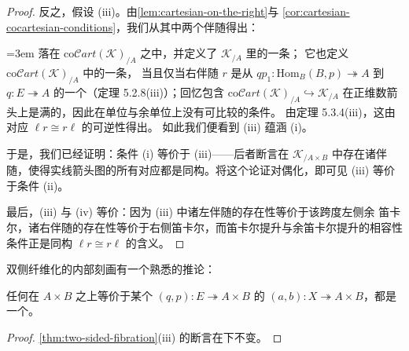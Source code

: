 \begin{proof}
反之，假设 (iii)。由\cref{lem:cartesian-on-the-right}与%
\cref{cor:cartesian-cocartesian-conditions}，我们从其中两个伴随得出：%
\trFunctor{}
\begin{center}
\end{center}
\begingroup\emergencystretch=3em\sloppy
落在 $\mathrm{co}\mathcal{C}\mathit{art}(\mathcal{K})_{/A}$ 之中，并定义了
$\mathcal{K}_{/A}$ 里的一条\trCartesianFibration{}；
它也定义 $\mathrm{co}\mathcal{C}\mathit{art}(\mathcal{K})_{/A}$ 中的一条\trCartesianFibration，
当且仅当右伴随 $r$ 是从 $qp_{1}\colon\mathrm{Hom}_{B}(B,p)\twoheadrightarrow A$
到 $q\colon E\twoheadrightarrow A$
的一个\trCartesianFunctor{}（定理 5.2.8(iii)）；回忆包含
$\mathrm{co}\mathcal{C}\mathit{art}(\mathcal{K})_{/A}\hookrightarrow\mathcal{K}_{/A}$
在正维数箭头上是满的，因此在单位与余单位上没有可比较的条件。
由定理 5.3.4(iii)，这由对应 $\ell r\cong r\ell$ 的可逆性得出。
如此我们便看到 (iii) 蕴涵 (i)。
\endgroup

于是，我们已经证明：条件 (i) 等价于 (iii)——后者断言在 $\mathcal{K}_{/A\times B}$
中存在诸伴随，使得实线箭头图的所有对应都是同构。将这个论证对偶化，即可见 (iii)
等价于条件 (ii)。

最后，(iii) 与 (iv) 等价：因为 (iii) 中诸左伴随的存在性等价于该跨度左侧余
笛卡尔，诸右伴随的存在性等价于右侧笛卡尔，而笛卡尔提升与余笛卡尔提升的相容性
条件正是同构 $\ell r\cong r\ell$ 的含义。
\end{proof}

双侧纤维化的内部刻画有一个熟悉的推论：

\begin{corollary}\label{cor:two-sided-fibration-retract}
任何在 $A\times B$ 之上等价于某个\trTwoSidedFibration{}
$(q,p)\colon E\twoheadrightarrow A\times B$ 的\trTwoSidedIsofibration
$(a,b)\colon X\twoheadrightarrow A\times B$，都是一个\trTwoSidedFibration{}。
\end{corollary}

\begin{proof}
\cref{thm:two-sided-fibration}(iii) 的断言在\trFiberedEquivalence{}下不变。
\end{proof}

